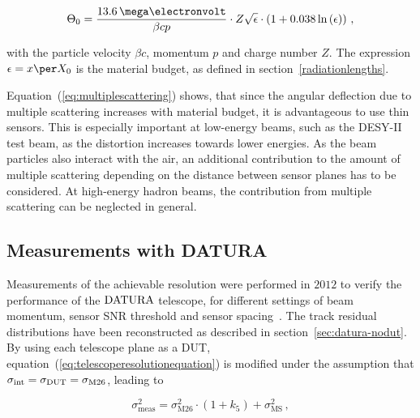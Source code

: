 \begin{equation}
\label{eq:multiplescattering}
\Theta_{0} = \frac{13.6\,\mega\electronvolt}{\beta c p} \cdot Z
\sqrt{\epsilon}
\cdot \left( 1 + 0.038 \ln{\left( \epsilon \right) } \right) \,,
\end{equation}

\noindent with the particle velocity $\beta c$, momentum $p$ and charge number $Z$. 
The expression $\epsilon = x \per X_0$ is the material budget, as defined in section~\ref{radiationlengths}.

Equation~(\ref{eq:multiplescattering}) shows, that since the angular deflection due to multiple scattering increases with material budget, it is advantageous to use thin sensors.
This is especially important at low-energy beams, such as the DESY-II test beam, as the distortion increases towards lower energies.
As the beam particles also interact with the air, an additional contribution to the amount of multiple scattering depending on the distance between sensor planes has to be considered. 
At high-energy hadron beams, the contribution from multiple scattering can be neglected in general.

\subsection{Measurements with DATURA}

Measurements of the achievable resolution were performed in $2012$ to verify the performance of the $\textrm{DATURA}$ telescope, for different settings of beam momentum, sensor SNR threshold and sensor spacing~\cite{ref:thomas}.
The track residual distributions have been reconstructed as described in section~\ref{sec:datura-nodut}.
By using each telescope plane as a DUT, equation~(\ref{eq:telescoperesolutionequation}) is modified under the assumption that $\sigma_{\textrm{int}} = \sigma_{\textrm{DUT}} = \sigma_{\textrm{M26}}$,
 leading to

\begin{equation}
\label{eq:telescoperesolutionequation_2}
\sigma_{\textrm{meas}}^2 = \sigma_{\textrm{M26}}^2 \cdot \left( 1 + k_5 \right) +
\sigma_{\textrm{MS}}^2\,,
\end{equation}


